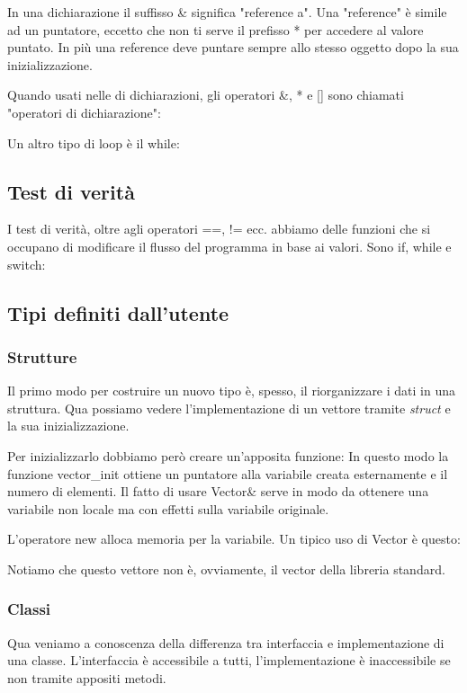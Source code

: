 \documentclass[11pt,a4paper]{book}
\begin{document}
In una dichiarazione il suffisso \& significa "reference a". Una "reference" è simile ad un puntatore, eccetto che non ti serve il prefisso * per accedere al valore puntato. In più una reference deve puntare sempre allo stesso oggetto dopo la sua inizializzazione.

Quando usati nelle di dichiarazioni, gli operatori \&, * e [] sono chiamati "operatori di dichiarazione":
\label{code: 008}

Un altro tipo di loop è il while:
\label{code: 009}

\subsection{Test di verità}
I test di verità, oltre agli operatori ==, != ecc. abbiamo delle funzioni che si occupano di modificare il flusso del programma in base ai valori. Sono if, while e switch:
\label{code: 010}
\label{code: 011}

\subsection{Tipi definiti dall'utente}
\subsubsection{Strutture}
Il primo modo per costruire un nuovo tipo è, spesso, il riorganizzare i dati in una struttura.
\label{code: 012}
Qua possiamo vedere l'implementazione di un vettore tramite \emph{struct} e la sua inizializzazione.

Per inizializzarlo dobbiamo però creare un'apposita funzione:
\label{code: 013}
In questo modo la funzione vector\_init ottiene un puntatore alla variabile creata esternamente e il numero di elementi. Il fatto di usare Vector\& serve in modo da ottenere una variabile non locale ma con effetti sulla variabile originale.

L'operatore new alloca memoria per la variabile. Un tipico uso di Vector è questo:
\label{code: 014}

Notiamo che questo vettore non è, ovviamente, il vector della libreria standard.

\subsubsection{Classi}
Qua veniamo a conoscenza della differenza tra interfaccia e implementazione di una classe. L'interfaccia è accessibile a tutti, l'implementazione è inaccessibile se non tramite appositi metodi.
\end{document}
